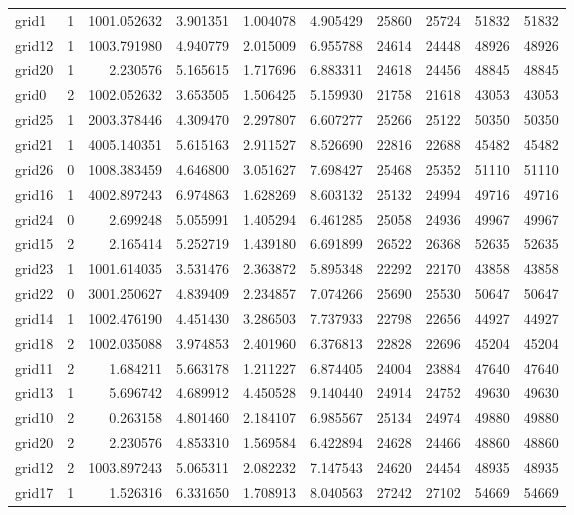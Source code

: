 \begin{longtable}{|l|r|r|r|r|r|r|r|r|r|}
grid1 & 1 & 1001.052632 & 3.901351 & 1.004078 & 4.905429 & 25860 & 25724 & 51832 & 51832 \\
grid12 & 1 & 1003.791980 & 4.940779 & 2.015009 & 6.955788 & 24614 & 24448 & 48926 & 48926 \\
grid20 & 1 & 2.230576 & 5.165615 & 1.717696 & 6.883311 & 24618 & 24456 & 48845 & 48845 \\
grid0 & 2 & 1002.052632 & 3.653505 & 1.506425 & 5.159930 & 21758 & 21618 & 43053 & 43053 \\
grid25 & 1 & 2003.378446 & 4.309470 & 2.297807 & 6.607277 & 25266 & 25122 & 50350 & 50350 \\
grid21 & 1 & 4005.140351 & 5.615163 & 2.911527 & 8.526690 & 22816 & 22688 & 45482 & 45482 \\
grid26 & 0 & 1008.383459 & 4.646800 & 3.051627 & 7.698427 & 25468 & 25352 & 51110 & 51110 \\
grid16 & 1 & 4002.897243 & 6.974863 & 1.628269 & 8.603132 & 25132 & 24994 & 49716 & 49716 \\
grid24 & 0 & 2.699248 & 5.055991 & 1.405294 & 6.461285 & 25058 & 24936 & 49967 & 49967 \\
grid15 & 2 & 2.165414 & 5.252719 & 1.439180 & 6.691899 & 26522 & 26368 & 52635 & 52635 \\
grid23 & 1 & 1001.614035 & 3.531476 & 2.363872 & 5.895348 & 22292 & 22170 & 43858 & 43858 \\
grid22 & 0 & 3001.250627 & 4.839409 & 2.234857 & 7.074266 & 25690 & 25530 & 50647 & 50647 \\
grid14 & 1 & 1002.476190 & 4.451430 & 3.286503 & 7.737933 & 22798 & 22656 & 44927 & 44927 \\
grid18 & 2 & 1002.035088 & 3.974853 & 2.401960 & 6.376813 & 22828 & 22696 & 45204 & 45204 \\
grid11 & 2 & 1.684211 & 5.663178 & 1.211227 & 6.874405 & 24004 & 23884 & 47640 & 47640 \\
grid13 & 1 & 5.696742 & 4.689912 & 4.450528 & 9.140440 & 24914 & 24752 & 49630 & 49630 \\
grid10 & 2 & 0.263158 & 4.801460 & 2.184107 & 6.985567 & 25134 & 24974 & 49880 & 49880 \\
grid20 & 2 & 2.230576 & 4.853310 & 1.569584 & 6.422894 & 24628 & 24466 & 48860 & 48860 \\
grid12 & 2 & 1003.897243 & 5.065311 & 2.082232 & 7.147543 & 24620 & 24454 & 48935 & 48935 \\
grid17 & 1 & 1.526316 & 6.331650 & 1.708913 & 8.040563 & 27242 & 27102 & 54669 & 54669 \\

\end{longtable}
